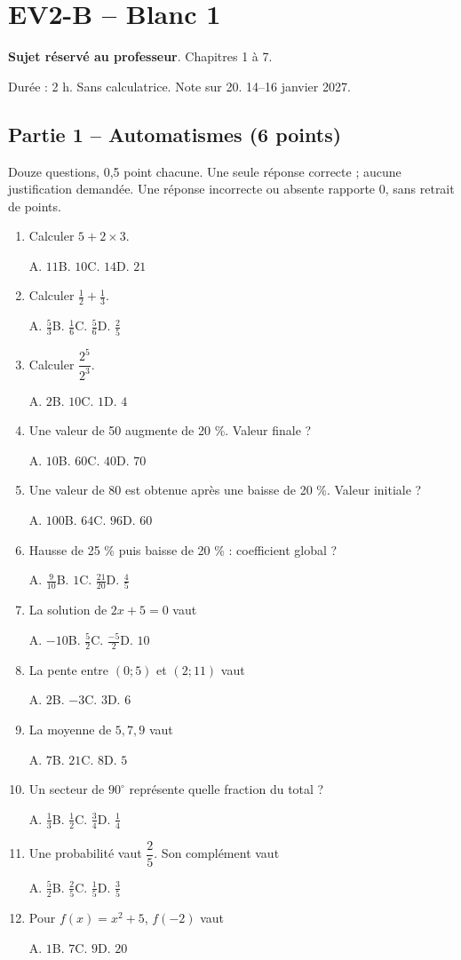 \clearpage\section*{EV2-B -- Blanc 1}\label{EV2-B}
\textbf{Sujet réservé au professeur}. Chapitres 1 à 7.\par Durée : 2 h. Sans calculatrice. Note sur 20. 14–16 janvier 2027.
\subsection*{Partie 1 -- Automatismes (6 points)}
Douze questions, 0,5 point chacune. Une seule réponse correcte ; aucune justification demandée. Une réponse incorrecte ou absente rapporte 0, sans retrait de points.
\begin{enumerate}
\item Calculer $5+2\times3$.\par A. $11$\quad B. $10$\quad C. $14$\quad D. $21$
\item Calculer $\frac12+\frac13$.\par A. $\frac{5}{3}$\quad B. $\frac{1}{6}$\quad C. $\frac{5}{6}$\quad D. $\frac{2}{5}$
\item Calculer $\dfrac{2^5}{2^{3}}$.\par A. $2$\quad B. $10$\quad C. $1$\quad D. $4$
\item Une valeur de 50 augmente de 20 \%. Valeur finale ?\par A. $10$\quad B. $60$\quad C. $40$\quad D. $70$
\item Une valeur de 80 est obtenue après une baisse de 20 \%. Valeur initiale ?\par A. $100$\quad B. $64$\quad C. $96$\quad D. $60$
\item Hausse de 25 \% puis baisse de 20 \% : coefficient global ?\par A. $\frac{9}{10}$\quad B. $1$\quad C. $\frac{21}{20}$\quad D. $\frac{4}{5}$
\item La solution de $2x+5=0$ vaut\par A. $-10$\quad B. $\frac{5}{2}$\quad C. $\frac{-5}{2}$\quad D. $10$
\item La pente entre $(0;5)$ et $(2;11)$ vaut\par A. $2$\quad B. $-3$\quad C. $3$\quad D. $6$
\item La moyenne de $5, 7, 9$ vaut\par A. $7$\quad B. $21$\quad C. $8$\quad D. $5$
\item Un secteur de $90^\circ$ représente quelle fraction du total ?\par A. $\frac{1}{3}$\quad B. $\frac{1}{2}$\quad C. $\frac{3}{4}$\quad D. $\frac{1}{4}$
\item Une probabilité vaut $\dfrac{2}{5}$. Son complément vaut\par A. $\frac{5}{2}$\quad B. $\frac{2}{5}$\quad C. $\frac{1}{5}$\quad D. $\frac{3}{5}$
\item Pour $f(x)=x^2+5$, $f(-2)$ vaut\par A. $1$\quad B. $7$\quad C. $9$\quad D. $20$
\end{enumerate}
